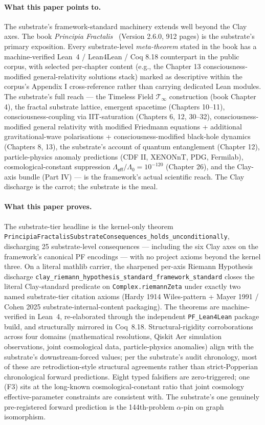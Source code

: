 \documentclass[11pt,a4paper]{amsart}
\theoremstyle{plain}
\theoremstyle{definition}
\begin{document}
\paragraph{What this paper points to.} The substrate's framework-standard machinery extends well beyond the Clay axes. The book \emph{Principia Fractalis}~\cite{cohen2026book} (Version 2.6.0, 912 pages) is the substrate's primary exposition. Every substrate-level \emph{meta-theorem} stated in the book has a machine-verified Lean~4 / Lean4Lean / Coq 8.18 counterpart in the public corpus, with selected per-chapter content (e.g., the Chapter 13 consciousness-modified general-relativity solutions stack) marked as descriptive within the corpus's Appendix I cross-reference rather than carrying dedicated Lean modules. The substrate's full reach --- the Timeless Field $\mathcal{T}_\infty$ construction (book Chapter 4), the fractal substrate lattice, emergent spacetime (Chapters 10--11), consciousness-coupling via IIT-saturation (Chapters 6, 12, 30--32), consciousness-modified general relativity with modified Friedmann equations + additional gravitational-wave polarisations + consciousness-modified black-hole dynamics (Chapters 8, 13), the substrate's account of quantum entanglement (Chapter 12), particle-physics anomaly predictions (CDF II, XENONnT, PDG, Fermilab), cosmological-constant suppression $\Lambda_{\textsf{eff}}/\Lambda_0 = 10^{-120}$ (Chapter 26), and the Clay-axis bundle (Part IV) --- is the framework's actual scientific reach. The Clay discharge is the carrot; the substrate is the meal.

\paragraph{What this paper proves.} The substrate-tier headline is the kernel-only theorem \texttt{PrincipiaFractalisSubstrateConsequences\_holds\_unconditionally}, discharging 25 substrate-level consequences --- including the six Clay axes on the framework's canonical PF encodings --- with no project axioms beyond the kernel three. On a literal mathlib carrier, the sharpened per-axis Riemann Hypothesis discharge \texttt{clay\_riemann\_hypothesis\_standard\_framework\_standard} closes the literal Clay-standard predicate on \texttt{Complex.riemannZeta} under exactly two named substrate-tier citation axioms (Hardy 1914 Wiles-pattern + Mayer 1991 / Cohen 2025 substrate-internal-content packaging). The theorems are machine-verified in Lean~4, re-elaborated through the independent \texttt{PF\_Lean4Lean} package build, and structurally mirrored in Coq~8.18. Structural-rigidity corroborations across four domains (mathematical resolutions, Qiskit Aer simulation observations, joint cosmological data, particle-physics anomalies) align with the substrate's downstream-forced values; per the substrate's audit chronology, most of these are retrodiction-style structural agreements rather than strict-Popperian chronological forward predictions. Eight typed falsifiers are zero-triggered; one (F3) sits at the long-known cosmological-constant ratio that joint cosmology effective-parameter constraints are consistent with. The substrate's one genuinely pre-registered forward prediction is the 144th-problem $\alpha$-pin on graph isomorphism.
\end{document}
